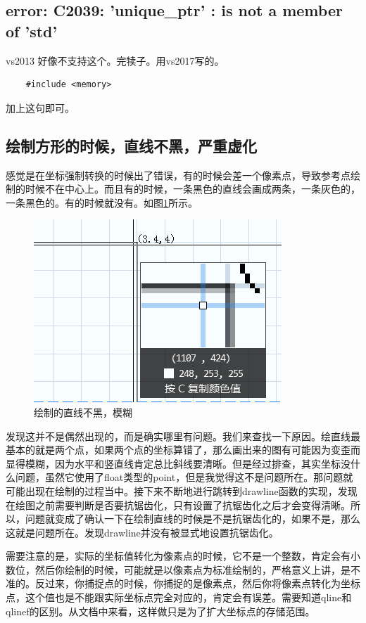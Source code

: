 \subsection{error: C2039: 'unique\_ptr' : is not a member of 'std'}
vs2013 好像不支持这个。完犊子。用vs2017写的。

\begin{lstlisting}
	#include <memory>
\end{lstlisting}

加上这句即可。
\subsection{绘制方形的时候，直线不黑，严重虚化}
感觉是在坐标强制转换的时候出了错误，有的时候会差一个像素点，导致参考点绘制的时候不在中心上。而且有的时候，一条黑色的直线会画成两条，一条灰色的，一条黑色的。有的时候就没有。如图\ref{fig:linemohu}所示。
\begin{figure}
	\centering
	\includegraphics[width=0.7\linewidth]{figures/linemohu}
	\caption{绘制的直线不黑，模糊}
	\label{fig:linemohu}
\end{figure}
发现这并不是偶然出现的，而是确实哪里有问题。我们来查找一下原因。绘直线最基本的就是两个点，如果两个点的坐标算错了，那么画出来的图有可能因为变歪而显得模糊，因为水平和竖直线肯定总比斜线要清晰。但是经过排查，其实坐标没什么问题，虽然它使用了float类型的point，但是我觉得这不是问题所在。那问题就可能出现在绘制的过程当中。接下来不断地进行跳转到drawline函数的实现，发现在绘图之前需要判断是否要抗锯齿化，只有设置了抗锯齿化之后才会变得清晰。所以，问题就变成了确认一下在绘制直线的时候是不是抗锯齿化的，如果不是，那么这就是问题所在。发现drawline并没有被显式地设置抗锯齿化。

需要注意的是，实际的坐标值转化为像素点的时候，它不是一个整数，肯定会有小数位，然后你绘制的时候，可能就是以像素点为标准绘制的，严格意义上讲，是不准的。反过来，你捕捉点的时候，你捕捉的是像素点，然后你将像素点转化为坐标点，这个值也是不能跟实际坐标点完全对应的，肯定会有误差。需要知道qline和qlinef的区别。从文档中来看，这样做只是为了扩大坐标点的存储范围。
